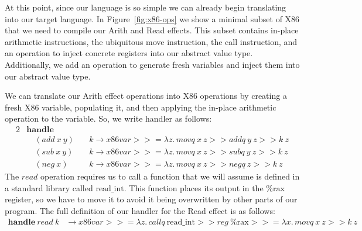 \documentclass[a4paper,UKenglish,cleveref, autoref, thm-restate, anonymous]{oasics-v2021}
\newcommand\bind[1]{>\!\!>\!\!= \lambda #1.\,}
\newcommand\then{>\!\!>}
\begin{document}
At this point, since our language is so simple we can already begin translating into our target language.
In Figure~\ref{fig:x86-ops} we show a minimal subset of X86 that we need to compile our Arith and Read effects.
This subset contains in-place arithmetic instructions, the ubiquitous move instruction, the call instruction, and an operation to inject concrete registers into our abstract value type.
Additionally, we add an operation to generate fresh variables and inject them into our abstract value type.

We can translate our Arith effect operations into X86 operations by creating a fresh X86 variable, populating it, and then applying the in-place arithmetic operation to the variable.
So, we write handler as follows:
\begin{alignat*}{2}
  & \mathbf{handle} && \\
  & \quad(\mathit{add}~x~y) &&~k \to \mathit{x86var} \bind{z} \mathit{movq}~x~z \then \mathit{addq}~y~z \then k~z \\
  & \quad(\mathit{sub}~x~y) &&~k \to \mathit{x86var} \bind{z} \mathit{movq}~x~z \then \mathit{subq}~y~z \then k~z \\
  & \quad(\mathit{neg}~x) &&~k \to \mathit{x86var} \bind{z} \mathit{movq}~x~z \then \mathit{negq}~z \then k~z
\end{alignat*}
The $\mathit{read}$ operation requires us to call a function that we will assume is defined in a standard library called $\mathrm{read\_int}$. This function places its output in the $\mathrm{\%rax}$ register, so we have to move it to avoid it being overwritten by other parts of our program.
The full definition of our handler for the Read effect is as follows:
\begin{align*}
  \mathbf{handle}~\mathit{read}~k & \to \mathit{x86var} \bind{z} \mathit{callq}~\mathrm{read\_int} \then \mathit{reg}~\mathrm{\%rax} \bind{x} \mathit{movq}~x~z \then k~z
\end{align*}
\end{document}
